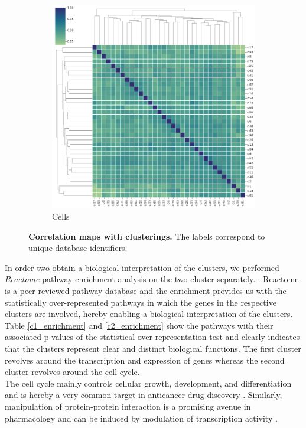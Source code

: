 \documentclass[bsc,frontabs,twoside,singlespacing,parskip,deptreport]{infthesis}     %
\begin{document}
\begin{figure}[h!]
\begin{subfigure}{.5\textwidth}
  \includegraphics[width=.9\linewidth]{images/cell_corr.png}
  \caption{Cells}
  \label{cell_map}
\end{subfigure}
\caption{\textbf{Correlation maps with clusterings.} The labels correspond to unique database identifiers.}
\label{corr_maps}
\end{figure}
In order two obtain a biological interpretation of the clusters, we performed \textit{Reactome} pathway enrichment analysis on the two cluster separately. \cite{fabregat_reactome_2017}. Reactome is a peer-reviewed pathway database and the enrichment provides us with the statistically over-represented pathways in which the genes in the respective clusters are involved, hereby enabling a biological interpretation of the clusters.\\
Table \ref{c1_enrichment} and \ref{c2_enrichment} show the pathways with their associated p-values of the statistical over-representation test and clearly indicates that the clusters represent clear and distinct biological functions. The first cluster revolves around the transcription and expression of genes whereas the second cluster revolves around the cell cycle.\\
The cell cycle mainly controls cellular growth, development, and differentiation and is hereby a very common target in anticancer drug discovery \cite{bai_cell_2017}. Similarly, manipulation of protein-protein interaction is a promising avenue in pharmacology and can be induced by modulation of transcription activity \cite{fontaine_pharmacological_2015}.
\end{document}

